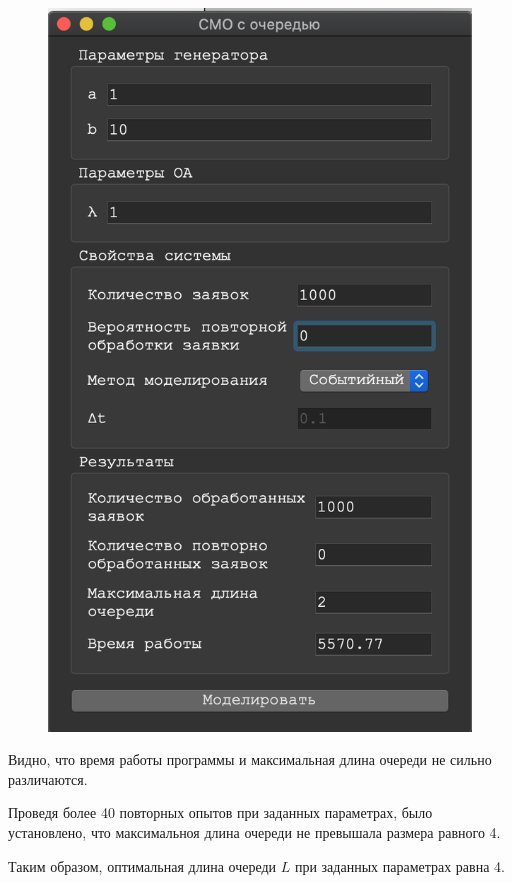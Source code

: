 \documentclass[a4paper,12pt]{article}
\begin{document}
\begin{figure}[h!]
\begin{minipage}[b]{0.32\textwidth}
			\includegraphics[width=\textwidth]{sob_1_3.png}
		\end{minipage}
		\label{ris:sob_1}
	\end{figure}

	Видно, что время работы программы и максимальная длина очереди не сильно различаются.
	
	Проведя более 40 повторных опытов при заданных параметрах, было установлено, что максимальноя длина очереди не превышала размера равного 4.
	
	Таким образом, оптимальная длина очереди $L$ при заданных параметрах равна 4.
	
\end{document}
